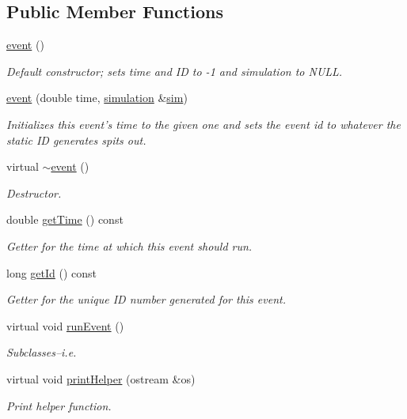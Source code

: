 \subsection*{Public Member Functions}
\begin{DoxyCompactItemize}
\item 
\hyperlink{classevent_a84a06dad1594d2d2a1d8bddff672d0a4}{event} ()
\begin{DoxyCompactList}\small\item\em Default constructor; sets time and I\-D to -\/1 and simulation to N\-U\-L\-L. \end{DoxyCompactList}\item 
\hyperlink{classevent_a10e6da45183cb40ae459dd2ab85e703d}{event} (double time, \hyperlink{classsimulation}{simulation} \&\hyperlink{classevent_a08c6d828bfb6f5539dcd1491e8ac77d2}{sim})
\begin{DoxyCompactList}\small\item\em Initializes this event's time to the given one and sets the event id to whatever the static I\-D generates spits out. \end{DoxyCompactList}\item 
\hypertarget{classevent_a9027354d797205dd1369b46f3485b8c4}{virtual \hyperlink{classevent_a9027354d797205dd1369b46f3485b8c4}{$\sim$event} ()}\label{classevent_a9027354d797205dd1369b46f3485b8c4}

\begin{DoxyCompactList}\small\item\em Destructor. \end{DoxyCompactList}\item 
double \hyperlink{classevent_a2ae66b1312a12b3b9f1bb7fa52bd8cc8}{get\-Time} () const 
\begin{DoxyCompactList}\small\item\em Getter for the time at which this event should run. \end{DoxyCompactList}\item 
long \hyperlink{classevent_ae287298290b26de20a09d6b63a201697}{get\-Id} () const 
\begin{DoxyCompactList}\small\item\em Getter for the unique I\-D number generated for this event. \end{DoxyCompactList}\item 
virtual void \hyperlink{classevent_a74b7b9e3b4dd30fb42a2612968def7ef}{run\-Event} ()
\begin{DoxyCompactList}\small\item\em Subclasses--i.\-e. \end{DoxyCompactList}\item 
virtual void \hyperlink{classevent_a14ef1b59ef1f5a8311c7cac315c271df}{print\-Helper} (ostream \&os)
\begin{DoxyCompactList}\small\item\em Print helper function. \end{DoxyCompactList}\end{DoxyCompactItemize}
